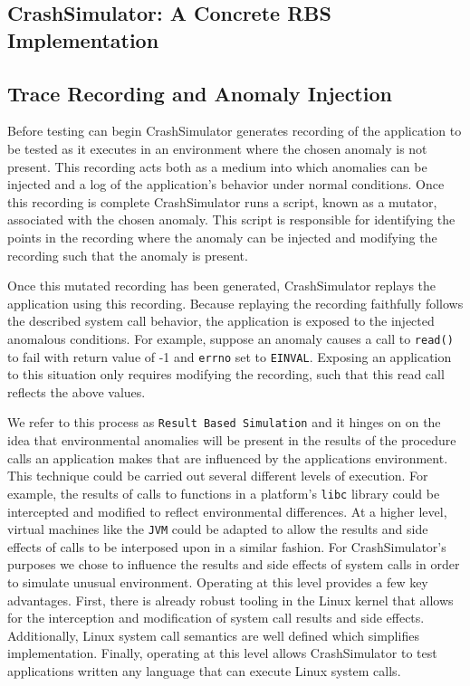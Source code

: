 \subsection{CrashSimulator: A Concrete RBS Implementation}


\subsection{Trace Recording and Anomaly Injection}

Before testing can begin
CrashSimulator generates recording of the application to be
tested as it executes in an environment where the chosen anomaly is not
present.  This recording acts both as a medium into which anomalies can be
injected and a log of the application's behavior under normal
conditions.  Once this recording is complete CrashSimulator runs a script,
known as a mutator, associated with the chosen anomaly.
This script is responsible for identifying
the points in the recording
where the anomaly can be injected and modifying
the recording such that the anomaly is present.

Once this mutated recording has been generated, CrashSimulator replays the
application using this recording.
Because replaying the
recording faithfully follows the described system call behavior, the
application is exposed to the injected
anomalous conditions.  For
example, suppose an anomaly causes a call to {\tt read()} to fail with
return value of -1 and {\tt errno} set to {\tt EINVAL}.  Exposing an
application to this situation only requires modifying the recording,
such that this read call reflects the above values.

We refer to this process as {\tt Result Based Simulation} and it hinges on
on the idea that environmental anomalies will be present in the results of
the procedure calls an application makes that are influenced by the
applications environment.
This technique could be carried out several different levels
of execution.  For example, the results of calls to functions in a
platform's {\tt libc} library could be intercepted and modified to reflect
environmental differences.  At a higher level, virtual machines like the
{\tt JVM} could be adapted to allow the results and side effects of calls
to be interposed upon in a similar fashion.
For CrashSimulator's purposes we chose to influence
the results and side effects of system calls in order to simulate
unusual environment.  Operating at this level provides a few key
advantages.  First, there is already robust tooling in the Linux kernel
that allows for the interception and modification of system call results
and side effects.  Additionally, Linux system call semantics are well
defined which simplifies implementation.  Finally, operating at this level
allows CrashSimulator to test applications written any language that can
execute Linux system calls.
